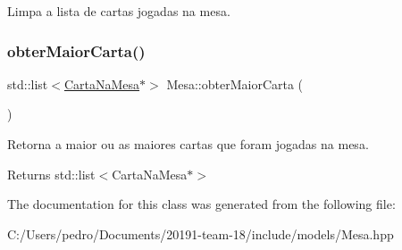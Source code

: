 Limpa a lista de cartas jogadas na mesa. 

\mbox{\label{class_mesa_a3c48d9d5efdc8b26956245abb4c568ef}} 
\subsubsection{\texorpdfstring{obterMaiorCarta()}{obterMaiorCarta()}}
{\footnotesize\ttfamily std\+::list$<$\mbox{\hyperlink{class_carta_na_mesa}{Carta\+Na\+Mesa}}$\ast$$>$ Mesa\+::obter\+Maior\+Carta (\begin{DoxyParamCaption}{ }\end{DoxyParamCaption})}



Retorna a maior ou as maiores cartas que foram jogadas na mesa. 

\begin{DoxyReturn}{Returns}
std\+::list$<$\+Carta\+Na\+Mesa$\ast$$>$ 
\end{DoxyReturn}


The documentation for this class was generated from the following file\+:\begin{DoxyCompactItemize}
\item 
C\+:/\+Users/pedro/\+Documents/20191-\/team-\/18/include/models/Mesa.\+hpp\end{DoxyCompactItemize}
